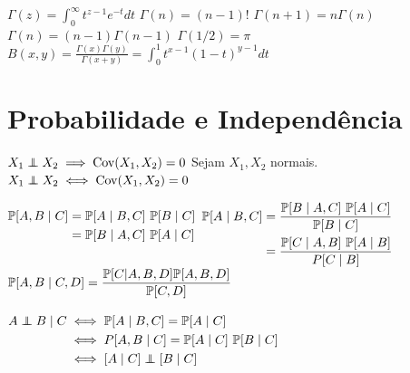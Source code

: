 \begin{theorem}
	\leavevmode
	\begin{outline}[enumerate]
		\1 \( \Gamma(z) =  \int_{0}^{\infty}t^{z-1}e^{-t}dt \)
		\1 \( \Gamma(n) = (n-1)! \)
		\1 \( \Gamma(n+1)=n\Gamma(n) \)
		\1 \( \Gamma(n)=(n-1)\Gamma(n-1)\)
		\1 \( \Gamma(1/2) = \pi \)
		\1 \(\displaystyle B(x,y) = \frac{\Gamma(x)\Gamma(y)}{\Gamma(x+y)}= \int_{0}^{1}t^{x-1}(1-t)^{y-1}dt \)
	\end{outline}
\end{theorem}


\section{Probabilidade e Independência}

\begin{theorem}[Independência]
	\leavevmode
	\begin{outline}[enumerate]
		\1 \( X_1 \indep X_2 \implies \Cov(X_1, X_2)=0 \)
		\1 Sejam $X_1, X_2$ normais. \( X_1 \indep X_2 \iff \Cov(X_1, X_2)=0  \)
	\end{outline}
\end{theorem}

\begin{theorem}
	\begin{outline}[enumerate]
		\leavevmode
		\1 \( \begin{aligned}[t]
			\P[A,B\mid C]  &= \P[A\mid B,C] \ \P[B\mid C] \\
			&= \P[B\mid A,C] \ \P[A\mid C]
		\end{aligned} \)
		\1 \( \begin{aligned}[t]
			\P[A\mid B, C]  &= \frac{\P[B\mid A,C] \ \P[A\mid C]}{\P[B\mid C]} \\
			&= \frac{\P[C\mid A,B] \ \P[A\mid B]}{P[C \mid B]}
		\end{aligned} \)
		\1 \( \begin{aligned}[t] 
			\P[A, B \mid C, D] &= \frac{\P[C | A, B, D] \P[A, B, D]}{\P[C, D]}
		\end{aligned} \)
	\end{outline}
\end{theorem}

\begin{theorem}
	\begin{outline}[enumerate]
		\leavevmode
		\1 \( \begin{aligned}[t] A  \indep B \mid C &\iff \P[A\mid B,C] = \P[A\mid C] \\ &\iff P[A, B \mid C] = \P[A\mid C] \ \P[B\mid C] \\
			&\iff [A\mid C] \indep [B\mid C]
		\end{aligned} \)
	\end{outline}
\end{theorem}


